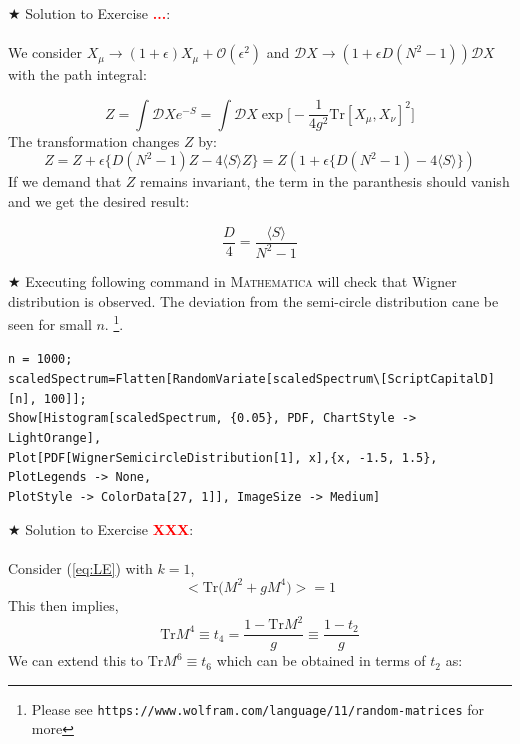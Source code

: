 \documentclass[11pt]{article}
\newcommand{\TODO}[1]{\textcolor{red}{{\bf #1}}}
\newcommand{\MA}{\textsc{Mathematica }}
\begin{document}
\noindent $\bigstar$ Solution to Exercise \TODO{...}: 
\\ \\ 
We consider $ X_{\mu} \to (1 + \epsilon) X_{\mu} + \mathcal{O}(\epsilon^2)$
and $\mathcal{D}X \to (1 + \epsilon D (N^2-1))\mathcal{D}X$ with the path integral:

\begin{equation}
Z = \int \mathcal{D}X e^{-S} = \int \mathcal{D}X \exp\Big[-\frac{1}{4g^2} \mbox{Tr} [X_\mu,X_\nu]^2\Big]
\end{equation}
The transformation changes $Z$ by:
\begin{equation}
	Z = Z + \epsilon \Big\{ D(N^2 -1)Z - 4\langle S \rangle Z  \Big\} = Z ( 1 + \epsilon \Big\{ D(N^2 -1) - 4\langle S \rangle   \Big\})
\end{equation}
If we demand that $Z$ remains invariant, the term in the paranthesis should vanish and we get the desired result:

\begin{equation}
	\frac{D}{4} = \frac{\langle S \rangle}{N^2 - 1 }
\end{equation}



\noindent $\bigstar$ Executing following command in \MA will check that Wigner distribution is 
observed. The deviation from the semi-circle distribution cane be seen for small 
$n$. \footnote{Please see \texttt{https://www.wolfram.com/language/11/random-matrices} for more}.  

\begin{mdframed}[backgroundcolor=magenta!3]
	\begin{footnotesize} 
		\verb"n = 1000;"\\ 
		\verb"scaledSpectrum=Flatten[RandomVariate[scaledSpectrum\[ScriptCapitalD][n], 100]];"\\
		\verb"Show[Histogram[scaledSpectrum, {0.05}, PDF, ChartStyle -> LightOrange], "  \\ 
		\verb"Plot[PDF[WignerSemicircleDistribution[1], x],{x, -1.5, 1.5}, PlotLegends -> None, " \\
		\verb"PlotStyle -> ColorData[27, 1]], ImageSize -> Medium]"
	\end{footnotesize} 
\end{mdframed}

\noindent $\bigstar$ Solution to Exercise \TODO{XXX}:
\\ \\ Consider (\ref{eq:LE}) with $k=1$, 
    \begin{equation}
    \Big< \mathrm{Tr}\Big(M^{2} + g M^{4}\Big) \Big> = 1 
    \end{equation}
    This then implies, 
     \begin{equation}
     \mathrm{Tr} M^{4} \equiv t_{4} = \frac{1 - \mathrm{Tr} M^{2}}{g} \equiv \frac{1 - t_2}{g} 
     \end{equation}
     We can extend this to $\mathrm{Tr} M^{6} \equiv t_{6}$ which can be obtained in terms of 
     $t_2$ as:  
     
\end{document}
